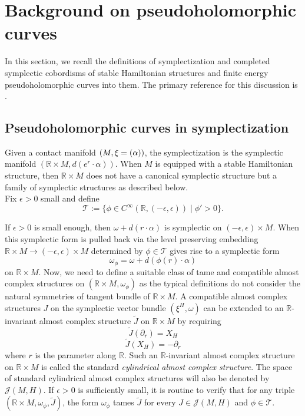 \documentclass[11pt, a4paper]{amsart}
\newcommand{\cJ}{\mathcal{J}}
\newcommand{\cT}{\mathcal{T}}
\let\ker\relax
\DeclareMathOperator{\ker}{Ker}
\begin{document}
\section{Background on pseudoholomorphic curves} \label{section: pseudoholomorphic curves}
In this section, we recall the definitions of symplectization and completed symplectic cobordisms of stable Hamiltonian structures and finite energy pseudoholomorphic curves into them. The primary reference for this discussion is \cite{SFTwendl}.

\subsection{Pseudoholomorphic curves in symplectization} \label{subsection: Pseudoholomorphic curves in symplectization}
Given a contact manifold $(M,\xi=\ker(\alpha))$, the symplectization is the symplectic manifold $(\mathbb{R}\times M, d(e^r{\cdot}\alpha))$. When $M$ is equipped with a stable Hamiltonian structure, then $\mathbb{R}\times M$ does not have a canonical symplectic structure but a family of symplectic structures as described below.\\

Fix $\epsilon>0$ small and define
$$\cT :=\{ \phi \in C^{\infty}(\mathbb{R},(-\epsilon,\epsilon))\mid \phi' >0\}.$$

If $\epsilon >0$ is small enough, then $\omega+ d(r {\cdot} \alpha)$ is symplectic on $(-\epsilon,\epsilon)\times M$. When this symplectic form is pulled back via the level preserving embedding $\mathbb{R}\times M \rightarrow (-\epsilon,\epsilon)\times M$ determined by $\phi \in \cT$ gives rise to a symplectic form $$\omega_{\phi} = \omega + d (\phi(r){\cdot} \alpha)$$ on $\mathbb{R}\times M$. Now, we need to define a suitable class of tame and compatible almost complex structures on $(\mathbb{R}\times M,\omega_{\phi})$ as the typical definitions do not consider the natural symmetries of tangent bundle of $\mathbb{R}\times M$. A compatible almost complex structures $J$ on the symplectic vector bundle $(\xi^H , \omega)$ can be extended to an $\mathbb{R}$-invariant almost complex structure $\tilde{J}$ on $\mathbb{R}\times M$ by requiring
$$\tilde{J}(\partial_r) = X_H$$ 
$$\tilde{J}(X_H)=-\partial_r$$
where $r$ is the parameter along $\mathbb{R}$. Such an $\mathbb{R}$-invariant almost complex structure on $\mathbb{R}\times M$ is called the standard \textit{cylindrical almost complex structure}. The space of standard cylindrical almost complex structures will also be denoted by $\cJ(M,H)$. If $\epsilon > 0$ is sufficiently small, it is routine to verify that for any triple $(\mathbb{R}\times M, \omega_{\phi}, \tilde{J})$, the form $\omega_{\phi}$ tames $\tilde{J}$ for every $J \in \mathcal{J}(M,H)$ and $\phi \in \mathcal{T}$.
\end{document}
